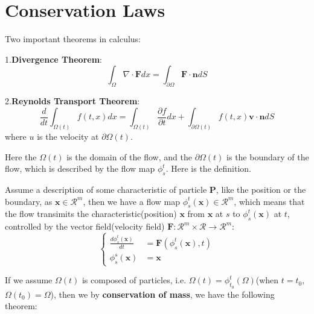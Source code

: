 \section{Conservation Laws}
\begin{theorem}Two important theorems in calculus:

    1.\textbf{Divergence Theorem}:
    \begin{equation}
        \int_{\Omega} \nabla \cdot \mathbf{F} d x = \int_{\partial \Omega} \mathbf{F} \cdot \mathbf{n} d S
    \end{equation}

    2.\textbf{Reynolds Transport Theorem}:
    \begin{equation}
        \frac{d}{dt}\int_{\Omega(t)} f(t, x) d x = \int_{\Omega (t)} \frac{\partial f}{\partial t} d x + \int_{\partial \Omega (t)} f(t, x) \mathbf{v} \cdot \mathbf{n} d S
    \end{equation}
    where $u$ is the velocity at $\partial \Omega (t)$.
\end{theorem}
Here the $\Omega(t)$ is the domain of the flow, and the $\partial \Omega(t)$ is the boundary of the flow, which is described by the flow map $\phi_s^t$. Here is the definition.
\begin{definition}
    Assume a description of some characteristic of particle $\mathbf{P}$, like the position or the boundary, as $\mathbf{x}\in \mathcal{R}^m$, then we have a flow map $\phi_s^t(\mathbf{x})\in \mathcal{R}^m$, 
    which means that the flow transimits the characteristic(position) $\mathbf{x}$ from $\mathbf{x}$ at $s$ to $\phi_s^t(\mathbf{x})$ at $t$, controlled by the vector field(velocity field) $\mathbf{F}: \mathcal{R}^m\times \mathcal{R}\to \mathcal{R}^m$:
    \begin{equation}\left\{
        \begin{aligned}
            \frac{d\phi_s^t(\mathbf{x})}{dt} &= \mathbf{F}(\phi_s^t(\mathbf{x}), t)\\
            \phi_s^s(\mathbf{x}) &= \mathbf{x}
        \end{aligned}\right.
    \end{equation}
\end{definition}
If we assume $\Omega(t)$ is composed of particles, i.e. $\Omega(t)=\phi_{t_0}^t(\Omega)$(when $t = t_0$, $\Omega(t_0)=\Omega$), 
then we by \textbf{conservation of mass}, we have the following theorem:
